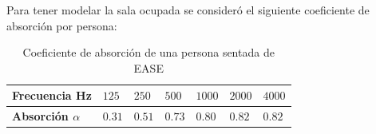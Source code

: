\noindent Para tener modelar la sala ocupada se consideró el siguiente coeficiente de absorción por persona:
\begin{table}[H]
    \centering
    \caption{Coeficiente de absorción de una persona sentada de EASE}
    \label{tab: coef abs persona}
    \begin{tabular}{|l|l|l|l|l|l|l|}
    \hline
    \textbf{Frecuencia Hz}      & $125$  & $250$  & $500$  & $1000$ & $2000$ & $4000$ \\ \hline
    \textbf{Absorción $\alpha$} & $0.31$ & $0.51$ & $0.73$ & $0.80$ & $0.82$ & $0.82$ \\ \hline
    \end{tabular}
\end{table}
